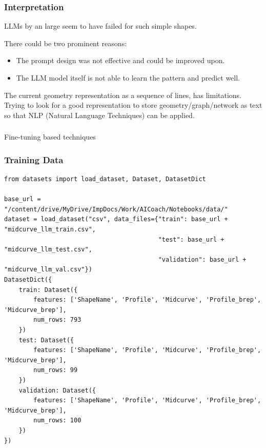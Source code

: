 \begin{frame}[fragile]\frametitle{Interpretation}

LLMs by an large seem to have failed for such simple shapes.

There could be two prominent reasons:

\begin{itemize}
\item The prompt design was not effective and could be improved upon.
\item The LLM model itself is not able to learn the pattern and predict well.
\end{itemize}	

The current geometry representation as a sequence of lines, has limitations. Trying to look for a good representation to store geometry/graph/network as text so that NLP (Natural Language Techniques) can be applied.
\end{frame}

\begin{frame}[fragile]\frametitle{}
\begin{center}
{\Large Fine-tuning based techniques}
\end{center}
\end{frame}


\begin{frame}[fragile]\frametitle{Training Data}

\begin{lstlisting}[basicstyle=\tiny, breaklines=true, breakatwhitespace=true,label=lst:python]
from datasets import load_dataset, Dataset, DatasetDict

base_url = "/content/drive/MyDrive/ImpDocs/Work/AICoach/Notebooks/data/"
dataset = load_dataset("csv", data_files={"train": base_url + "midcurve_llm_train.csv",
                                          "test": base_url + "midcurve_llm_test.csv",
                                          "validation": base_url + "midcurve_llm_val.csv"})
DatasetDict({
    train: Dataset({
        features: ['ShapeName', 'Profile', 'Midcurve', 'Profile_brep', 'Midcurve_brep'],
        num_rows: 793
    })
    test: Dataset({
        features: ['ShapeName', 'Profile', 'Midcurve', 'Profile_brep', 'Midcurve_brep'],
        num_rows: 99
    })
    validation: Dataset({
        features: ['ShapeName', 'Profile', 'Midcurve', 'Profile_brep', 'Midcurve_brep'],
        num_rows: 100
    })
})

\end{lstlisting}

\end{frame}

